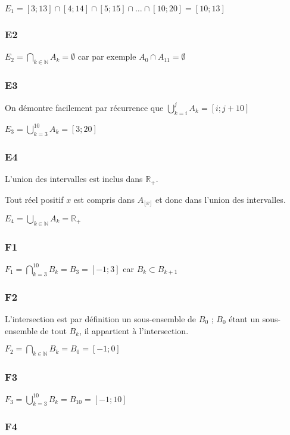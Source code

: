 \documentclass[a4paper,10pt]{report}
\begin{document}
$E_1 = [3;13]\cap[4;14]\cap[5;15]\cap \ldots \cap [10 ; 20] = [10 ; 13]$

\subsubsection*{E2}

$E_2 = \bigcap_{k \in \mathbb{N}} A_k = \emptyset$ car par exemple $A_0 \cap A_{11} = \emptyset$

\subsubsection*{E3}

On démontre facilement par récurrence que $\bigcup_{k=i}^{j} A_k = [i ; j+10]$

$E_3 = \bigcup_{k=3}^{10} A_k= [3 ; 20]$

\subsubsection*{E4}

L'union des intervalles est inclus dans $\mathbb{R}_+$.

Tout réel positif $x$ est compris dans $A_{\lfloor x \rfloor}$ et donc dans l'union des intervalles.

$E_4 = \bigcup_{k \in \mathbb{N}} A_k = \mathbb{R}_+$

\subsubsection*{F1}

$F_1 = \bigcap_{k=3}^{10} B_k= B_3 = [-1 ; 3]$ car $B_k \subset B_{k+1}$

\subsubsection*{F2}

L'intersection est par définition un sous-ensemble de $B_0$ ; $B_0$ étant un sous-ensemble de tout $B_k$, il appartient 
à l'intersection.

$F_2 = \bigcap_{k \in \mathbb{N}} B_k= B_0 = [-1 ; 0]$

\subsubsection*{F3}


$F_3 = \bigcup_{k=3}^{10} B_k = B_{10} = [-1 ; 10]$

\subsubsection*{F4}
\end{document}
